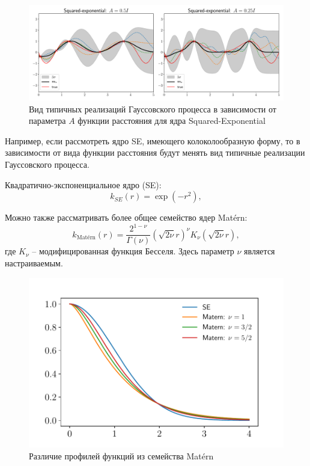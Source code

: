 \documentclass[12pt,fleqn]{article}
\begin{document}
\begin{figure}[t]
    \includegraphics[scale=0.4,center]{SE.pdf}
      \caption{Вид типичных реализаций Гауссовского процесса в зависимости от параметра $A$ функции расстояния для ядра Squared-Exponential}
      \label{fig:se}
\end{figure}

Например, если рассмотреть ядро SE, имеющего колоколообразную форму, то в зависимости от вида функции расстояния будут менять вид типичные реализации Гауссовского процесса.

Квадратично-экспоненциальное ядро (SE):
$$
    k_{SE}(r) = \exp\left(-r^2\right),
$$





Можно также рассматривать более общее семейство ядер Matérn:
$$
    k_{\text{Matérn}}(r) = \frac{2^{1-\nu}}{\Gamma(\nu)}\left( \sqrt{2\nu}r\right)^{\nu}K_{\nu}\left(\sqrt{2\nu}r\right),
$$
где $K_\nu$ -- модифицированная функция Бесселя. Здесь параметр $\nu$ является настраиваемым.
\begin{figure}[h]
    \includegraphics[scale=0.8,center]{diff_kernels.pdf}
      \caption{Различие профилей функций из семейства Matérn}
      \label{fig:diff_kernels}
\end{figure}
\end{document}
